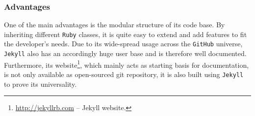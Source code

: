 \subsubsection{Advantages}
One of the main advantages is the modular structure of its code base. By inheriting different \texttt{Ruby} classes, it is quite easy to extend and add features to fit the developer's needs. Due to its wide-spread usage across the \texttt{GitHub} universe, \texttt{Jekyll} also has an accordingly huge user base and is therefore well documented.\\ Furthermore, its website\footnote{\url{http://jekyllrb.com} -- Jekyll website.}, which mainly acts as starting basis for documentation, is not only available as open-sourced git repository, it is also built using \texttt{Jekyll} to prove its universality.
